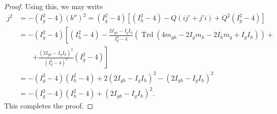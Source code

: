\documentclass[10pt,a4paper]{amsart}
\newcommand{\Trd}{\operatorname{Trd}}
\begin{document}
\begin{proof}
\noindent Using this, we may write
\begin{align*} j^2 &= -(I_g^2-4)(b'')^2= (I_g^2-4)[(I_h^2 -4) - Q(ij' + j'i) + Q^2 (I_g^2-4)] \\
                   &= -(I_g^2-4)\left[(I_h^2 -4) -
                     \frac{2I_{gh}-I_gI_h}{I_g^2-4}(\Trd(4m_{gh}-2I_gm_h-2I_hm_g+I_gI_h))+ \right. \\
                     & \qquad \left.+\frac{(2I_{gh}-I_gI_h)^2}{(I_g^2-4)^{2}}(I_g^2-4)\right] \\
                   &= -(I_g^2-4)(I_h^2-4) +2(2I_{gh}-I_gI_h)^2-(2I_{gh}-I_gI_h)^2 \\
                   &=-(I_g^2-4)(I_h^2-4)  + (2I_{gh}-I_gI_h)^2.
\end{align*}
This completes the proof.
\end{proof}
\end{document}
